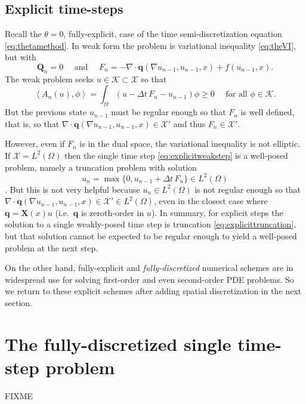 \documentclass[final,leqno,onefignum,onetabnum]{siamltex1213bueler}
\newcommand\bq{\mathbf{q}}
\newcommand\bQ{\mathbf{Q}}
\newcommand\bX{\mathbf{X}}
\newcommand{\Div}{\nabla\cdot}
\renewcommand{\grad}{\nabla}
\newcommand{\ip}[2]{\ensuremath{\left<#1,#2\right>}}
\begin{document}
\subsection{Explicit time-steps} \label{subsec:explicit}  Recall the $\theta=0$, fully-explicit, case of the time semi-discretization equation \eqref{eq:thetamethod}.  In weak form the problem is variational inequality \eqref{eq:theVI}, but with
    $$\bQ_n=0 \quad \text{ and } \quad F_n = - \Div \bq(\grad u_{n-1},u_{n-1},x) + f(u_{n-1},x).$$
The weak problem seeks $u\in\mathcal{K} \subset \mathcal{X}$ so that
\begin{equation}
\ip{A_n(u)}{\phi} = \int_\Omega (u - \Delta t\,F_n - u_{n-1})\phi \ge 0 \quad \text{ for all } \phi \in \mathcal{K}.  \label{eq:explicitweakstep}
\end{equation}
But the previous state $u_{n-1}$ must be regular enough so that $F_n$ is well defined, that is, so that $\Div \bq(\grad u_{n-1},u_{n-1},x) \in \mathcal{X}'$ and thus $F_n\in\mathcal{X}'$.

However, even if $F_n$ is in the dual space, the variational inequality is not elliptic.  If $\mathcal{X}=L^2(\Omega)$ then the single time step \eqref{eq:explicitweakstep} is a well-posed problem, namely a truncation problem with solution
\begin{equation}
u_n = \max\{0,u_{n-1} + \Delta t\,F_n\} \in L^2(\Omega)  \label{eq:explicittruncation}
\end{equation}
\cite[page 27]{KinderlehrerStampacchia}.  But this is not very helpful because $u_n \in L^2(\Omega)$ is not regular enough so that $\Div \bq(\grad u_{n-1},u_{n-1},x) \in \mathcal{X}' \in L^2(\Omega)$, even in the closest case where $\bq = \bX(x) u$ (i.e.~$\bq$ is zeroth-order in $u$).  In summary, for explicit steps the solution to a single weakly-posed time step is truncation \eqref{eq:explicittruncation}, but that solution cannot be expected to be regular enough to yield a well-posed problem at the next step.

On the other hand, fully-explicit and \emph{fully-discretized} numerical schemes are in widespread use for solving first-order and even second-order PDE problems.  So we return to these explicit schemes after adding spatial discretization in the next section.


\section{The fully-discretized single time-step problem}  \label{sec:spacediscretized} FIXME
\end{document}
